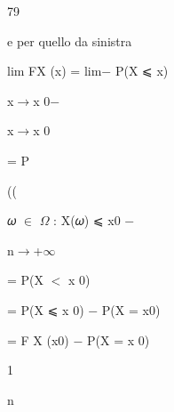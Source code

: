 \documentclass[a4paper,portrait,12pt]{article}
\begin{document}
79





\begin{flushleft}
e per quello da sinistra
\end{flushleft}


\begin{flushleft}
lim FX (x) = lim$-$ P(X ⩽ x)
\end{flushleft}





\begin{flushleft}
x$\rightarrow$x 0$-$
\end{flushleft}





\begin{flushleft}
x$\rightarrow$x 0
\end{flushleft}





\begin{flushleft}
= P
\end{flushleft}





((





\begin{flushleft}
𝜔 $\in$ $\Omega$ : X(𝜔) ⩽ x0 $-$
\end{flushleft}


\begin{flushleft}
n$\rightarrow$+$\infty$
\end{flushleft}





\begin{flushleft}
= P(X $<$ x 0)
\end{flushleft}


\begin{flushleft}
= P(X ⩽ x 0) $-$ P(X = x0)
\end{flushleft}


\begin{flushleft}
= F X (x0) $-$ P(X = x 0)
\end{flushleft}





1


\begin{flushleft}
n
\end{flushleft}
\end{document}
